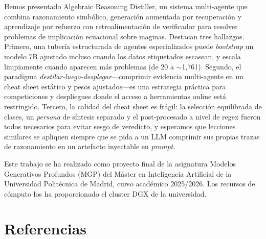 \documentclass{article}
\begin{document}
Hemos presentado Algebraic Reasoning Distiller, un sistema multi-agente que combina razonamiento simb\'olico, generaci\'on aumentada por recuperaci\'on y aprendizaje por refuerzo con retroalimentaci\'on de verificador para resolver problemas de implicaci\'on ecuacional sobre magmas. Destacan tres hallazgos. Primero, una tuber\'ia estructurada de agentes especializados puede \textit{bootstrap} un modelo 7B ajustado incluso cuando los datos etiquetados escasean, y escala limpiamente cuando aparecen m\'as problemas (de 20 a $\sim$1{,}761). Segundo, el paradigma \textit{destilar-luego-desplegar}---comprimir evidencia multi-agente en un cheat sheet est\'atico y pesos ajustados---es una estrategia pr\'actica para competiciones y despliegues donde el acceso a herramientas online est\'a restringido. Tercero, la calidad del cheat sheet es fr\'agil: la selecci\'on equilibrada de clases, un \textit{persona} de s\'intesis separado y el post-procesado a nivel de regex fueron todos necesarios para evitar sesgo de veredicto, y esperamos que lecciones similares se apliquen siempre que se pida a un LLM comprimir sus propias trazas de razonamiento en un artefacto inyectable en \textit{prompt}.

\begin{ack}
Este trabajo se ha realizado como proyecto final de la asignatura Modelos Generativos Profundos (MGP) del M\'aster en Inteligencia Artificial de la Universidad Polit\'ecnica de Madrid, curso acad\'emico 2025/2026. Los recursos de c\'omputo los ha proporcionado el cluster DGX de la universidad.
\end{ack}

\section*{Referencias}
\end{document}
